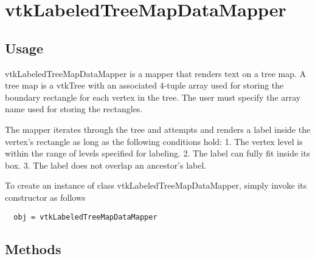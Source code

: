 \section{vtkLabeledTreeMapDataMapper}

\subsection{Usage}

 vtkLabeledTreeMapDataMapper is a mapper that renders text on a tree map.
 A tree map is a vtkTree with an associated 4-tuple array
 used for storing the boundary rectangle for each vertex in the tree.
 The user must specify the array name used for storing the rectangles.

 The mapper iterates through the tree and attempts and renders a label
 inside the vertex's rectangle as long as the following conditions hold:
 1. The vertex level is within the range of levels specified for labeling.
 2. The label can fully fit inside its box.
 3. The label does not overlap an ancestor's label.


To create an instance of class vtkLabeledTreeMapDataMapper, simply
invoke its constructor as follows
\begin{verbatim}
  obj = vtkLabeledTreeMapDataMapper
\end{verbatim}
\subsection{Methods}

